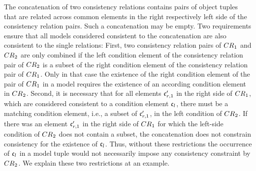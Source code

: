 The concatenation of two consistency relations contains pairs of object tuples that are related across common elements in the right respectively left side of the consistency relation pairs.
Such a concatenation may be empty.
Two requirements ensure that all models considered consistent to the concatenation are also consistent to the single relations:
First, two consistency relation pairs of $\consistencyrelation{CR}{1}$ and $\consistencyrelation{CR}{2}$ are only combined if the left condition element of the consistency relation pair of $\consistencyrelation{CR}{2}$ is a subset of the right condition element of the consistency relation pair of $\consistencyrelation{CR}{1}$.
Only in that case the existence of the right condition element of the pair of $\consistencyrelation{CR}{1}$ in a model requires the existence of an according condition element in $\consistencyrelation{CR}{2}$.
Second, it is necessary that for all elements $\conditionelement{c}{r,1}'$ in the right side of $\consistencyrelation{CR}{1}$, which are considered consistent to a condition element $\conditionelement{c}{l}$, there must be a matching condition element, i.e., a subset of $\conditionelement{c}{r,1}'$, in the left condition of $\consistencyrelation{CR}{2}$.
If there was an element $\conditionelement{c}{r,1}'$ in the right side of $\consistencyrelation{CR}{1}$ for which the left-side condition of $\consistencyrelation{CR}{2}$ does not contain a subset, the concatenation does not constrain consistency for the existence of $\conditionelement{c}{l}$.
Thus, without these restrictions the occurrence of $\conditionelement{c}{l}$ in a model tuple would not necessarily impose any consistency constraint by $\consistencyrelation{CR}{2}$.
We explain these two restrictions at an example.

